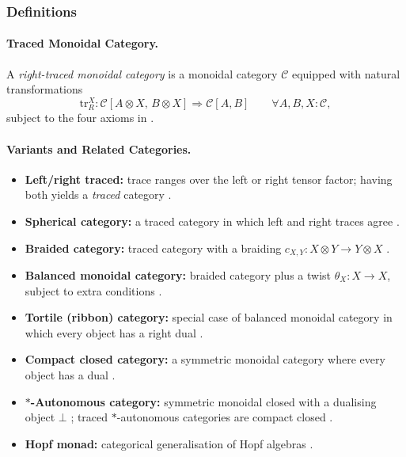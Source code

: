 \subsubsection*{Definitions}
\paragraph{Traced Monoidal Category.}
A \emph{right-traced monoidal category} is a monoidal category $\mathcal{C}$ equipped with natural transformations
$$
	\mathrm{tr}_{R}^{X} : \mathcal{C}[A \otimes X,\, B \otimes X] \Rightarrow \mathcal{C}[A,B]
	\qquad \forall A,B,X : \mathcal{C},
$$
subject to the four axioms in \cite{joyal1996-traced-monoidal-categories}.
\paragraph{Variants and Related Categories.}
\begin{itemize}
	\item \textbf{Left/right traced:} trace ranges over the left or right
	      tensor factor; having both yields a \emph{traced} category
	      \cite{joyal1996-traced-monoidal-categories}.
	\item \textbf{Spherical category:} a traced category in which left and
	      right traces agree \cite{barrett1999-spherical-categories}.
	\item \textbf{Braided category:} traced category with a braiding $c_{X,Y} : X \otimes Y \to Y \otimes X$ \cite{joyal1993-braided-tensor-categories}.
	\item \textbf{Balanced monoidal category:} braided category plus a twist
	      $\theta_X : X \to X$, subject to extra conditions
	      \cite{joyal1991-geometry-tensor-calculus-2}.
	\item \textbf{Tortile (ribbon) category:} special case of balanced monoidal
	      category in which every object has a right dual
	      \cite{shum1994-tortile-tensor-categories}.
	\item \textbf{Compact closed category:} a symmetric monoidal category where
	      every object has a dual \cite{day1977-note-compact-closed}.
	\item \textbf{$*$-Autonomous category:} symmetric monoidal closed with a
	      dualising object $\bot$ \cite{barr2006-autonomous-categories}; traced
	      $*$-autonomous categories are compact closed
	      \cite{hajgato2013-traced-autonomous-categories}.
	\item \textbf{Hopf monad:} categorical generalisation of Hopf algebras
	      \cite{bruguieres2011-hopf-monads-monoidal,bruguieres2007-hopf-monads,hasegawa2023-traced-monads-hopf}.
\end{itemize}
